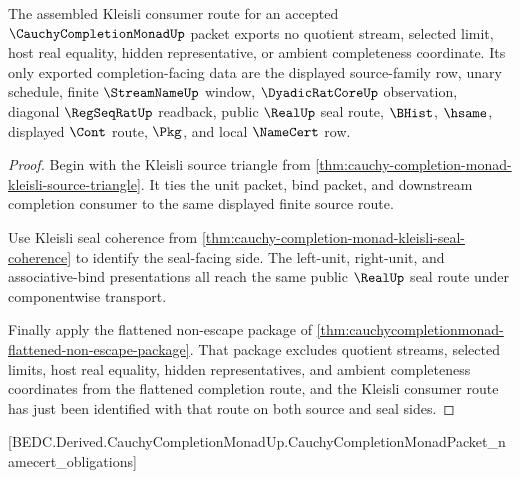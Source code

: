 \begin{theorem}
\label{thm:cauchy-completion-monad-kleisli-non-escape}
The assembled Kleisli consumer route for an accepted $\CauchyCompletionMonadUp$ packet exports no quotient stream, selected limit, host real equality, hidden representative, or ambient completeness coordinate. Its only exported completion-facing data are the displayed source-family row, unary schedule, finite $\StreamNameUp$ window, $\DyadicRatCoreUp$ observation, diagonal $\RegSeqRatUp$ readback, public $\RealUp$ seal route, $\BHist$, $\hsame$, displayed $\Cont$ route, $\Pkg$, and local $\NameCert$ row.
\end{theorem}
\begin{proof}
Begin with the Kleisli source triangle from \autoref{thm:cauchy-completion-monad-kleisli-source-triangle}. It ties the unit packet, bind packet, and downstream completion consumer to the same displayed finite source route.

Use Kleisli seal coherence from \autoref{thm:cauchy-completion-monad-kleisli-seal-coherence} to identify the seal-facing side. The left-unit, right-unit, and associative-bind presentations all reach the same public $\RealUp$ seal route under componentwise transport.

Finally apply the flattened non-escape package of \autoref{thm:cauchycompletionmonad-flattened-non-escape-package}. That package excludes quotient streams, selected limits, host real equality, hidden representatives, and ambient completeness coordinates from the flattened completion route, and the Kleisli consumer route has just been identified with that route on both source and seal sides.
\end{proof}

[BEDC.Derived.CauchyCompletionMonadUp.CauchyCompletionMonadPacket\_namecert\_obligations]

